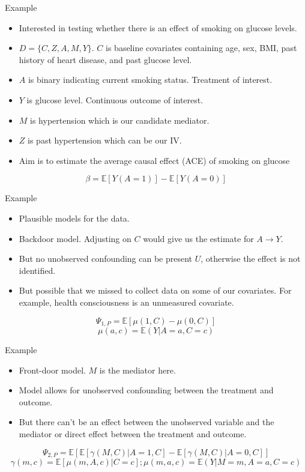 \documentclass{beamer}
\begin{document}
\begin{frame}{Example}
	\begin{itemize}
		\item Interested in testing whether there is an effect of smoking on glucose levels.
		\item $ D = \{ C, Z, A, M, Y \} $. $ C $ is baseline covariates containing age, sex, BMI, past history of heart disease, and past glucose level.
		\item $ A $ is binary indicating current smoking status. Treatment of interest.
		\item $ Y $ is glucose level. Continuous outcome of interest.
		\item $ M $ is hypertension which is our candidate mediator.
		\item $ Z $ is past hypertension which can be our IV.
		\item Aim is to estimate the average causal effect (ACE) of smoking on glucose
	\end{itemize}
			$$ \beta = \mathbb{E}[Y(A=1)] - \mathbb{E}[Y(A=0)] $$
\end{frame}

\begin{frame}{Example}
	\begin{itemize}
		\item Plausible models for the data.
		\item Backdoor model. Adjusting on $ C $ would give us the estimate for $ A \rightarrow Y $.
		\item But no unobserved confounding can be present $ U $, otherwise the effect is not identified.
		\item But possible that we missed to collect data on some of our covariates. For example, health consciousness is an unmeasured covariate. %
	\end{itemize}
	$$ \Psi_{1, P} = \mathbb{E}[\mu(1, C) - \mu(0, C)] $$
	$$ \mu(a, c) = \mathbb{E}(Y | A=a, C=c) $$
\end{frame}

\begin{frame}{Example}
	\begin{itemize}
		\item Front-door model. $ M $ is the mediator here.
		\item Model allows for unobserved confounding between the treatment and outcome.
		\item But there can't be an effect between the unobserved variable and the mediator or direct effect between the treatment and outcome.
	\end{itemize}
	$$ \Psi_{2, P} = \mathbb{E}[\mathbb{E}[\gamma(M, C) | A = 1, C] - \mathbb{E}[\gamma(M, C) | A =0, C]] $$
	$$ \gamma(m, c) = \mathbb{E}[\mu(m, A, c) | C=c]; \mu(m, a, c) = \mathbb{E}(Y | M=m, A=a, C=c) $$
\end{frame}
\end{document}

